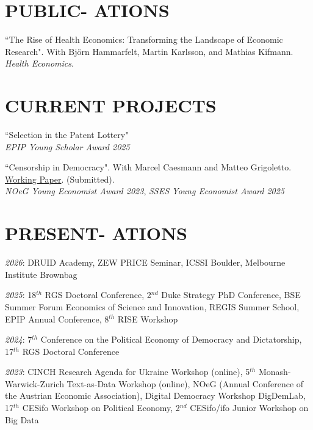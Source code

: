 \documentclass[margin, 12pt]{res} %
\begin{document}
\begin{resume}
		\section{PUBLIC- ATIONS}
		``The Rise of Health Economics: Transforming the Landscape of Economic Research". With Björn Hammarfelt, Martin Karlsson, and Mathias Kifmann. \textit{Health Economics}.
		
		\section{CURRENT PROJECTS}
		
		``Selection in the Patent Lottery" \\
		{\sl EPIP Young Scholar Award 2025}
		
		``Censorship in Democracy". With Marcel Caesmann and Matteo Grigoletto. \href{https://www.zora.uzh.ch/id/eprint/260103/}{Working Paper}. (Submitted). \\
		{\sl NOeG Young Economist Award 2023}, {\sl SSES Young Economist Award 2025}
		
		\section{PRESENT- ATIONS}
		{\sl2026}: DRUID Academy, ZEW PRICE Seminar, ICSSI Boulder, Melbourne Institute Brownbag %
		
		{\sl2025}: 18$^{th}$ RGS Doctoral Conference, 2$^{nd}$ Duke Strategy PhD Conference, BSE Summer Forum Economics of Science and Innovation, REGIS Summer School, EPIP Annual Conference, 8$^{th}$ RISE Workshop %
		
		{\sl2024}: 7$^{th}$ Conference on the Political Economy of Democracy and Dictatorship, 17$^{th}$ RGS Doctoral Conference
		
		{\sl2023}: CINCH Research Agenda for Ukraine Workshop (online), 5$^{th}$ Monash-Warwick-Zurich Text-as-Data Workshop (online), NOeG (Annual Conference of the Austrian Economic Association), Digital Democracy Workshop DigDemLab, 17$^{th}$ CESifo Workshop on Political Economy, 2$^{nd}$ CESifo/ifo Junior Workshop on Big Data
		

\end{resume}
\end{document}
